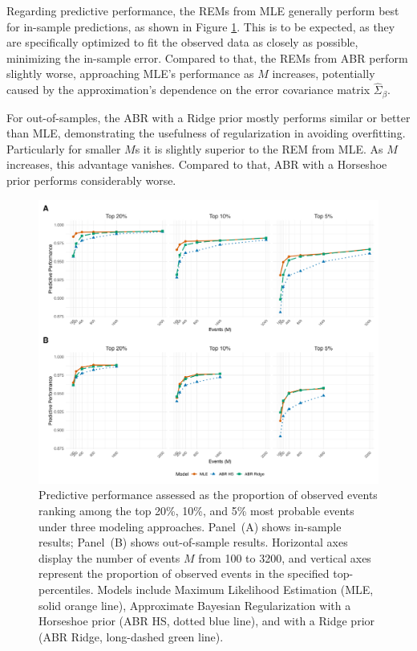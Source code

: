 \documentclass{article}
\begin{document}
\begin{spacing}{2}
\begin{justify}
Regarding predictive performance, the REMs from MLE generally perform best for in-sample predictions, as shown in Figure \ref{fig:predictive_performance}. This is to be expected, as they are specifically optimized to fit the observed data as closely as possible, minimizing the in-sample error. Compared to that, the REMs from ABR perform slightly worse, approaching MLE's performance as $M$ increases, potentially caused by the approximation's dependence on the error covariance matrix $\hat{\Sigma}_{\beta}$.

For out-of-samples, the ABR with a Ridge prior mostly performs similar or better than MLE, demonstrating the usefulness of regularization in avoiding overfitting. Particularly for smaller $M$s it is slightly superior to the REM from MLE. As $M$ increases, this advantage vanishes. Compared to that, ABR with a Horseshoe prior performs considerably worse.

\begin{figure}[H]
    \centering
    \includegraphics[width=\textwidth]{img/predictive_performance.png}
    \caption{Predictive performance assessed as the proportion of observed events ranking among the top 20\%, 10\%, and 5\% most probable events under three modeling approaches. Panel~(A) shows in-sample results; Panel~(B) shows out-of-sample results. Horizontal axes display the number of events $M$ from 100 to 3200, and vertical axes represent the proportion of observed events in the specified top-percentiles. Models include Maximum Likelihood Estimation (MLE, solid orange line), Approximate Bayesian Regularization with a Horseshoe prior (ABR HS, dotted blue line), and with a Ridge prior (ABR Ridge, long-dashed green line).}
    \label{fig:predictive_performance}
\end{figure}


\end{justify}
\end{spacing}
\end{document}
